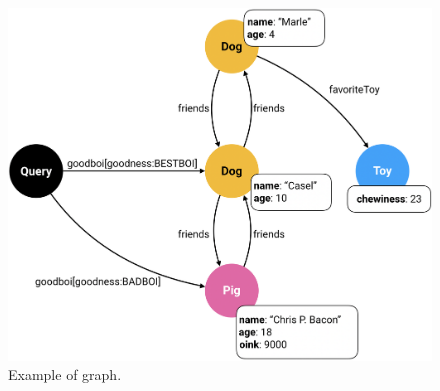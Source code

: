 





\begin{figure}
    \centering
    \includegraphics[scale=0.33]{imgs/graph.png}
    \caption{Example of \gql graph.}
    \label{fig:graph_ex}
\end{figure}


